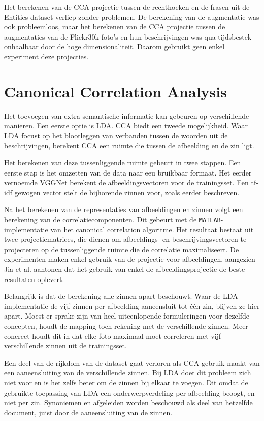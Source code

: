 Het berekenen van de CCA projectie tussen de rechthoeken en de frasen uit de Entities dataset verliep zonder problemen. De berekening van de augmentatie was ook probleemloos, maar het berekenen van de CCA projectie tussen de augmentaties van de Flickr30k foto's en hun beschrijvingen was qua tijdsbestek onhaalbaar door de hoge dimensionaliteit. Daarom gebruikt geen enkel experiment deze projecties. 



\section{Canonical Correlation Analysis}
Het toevoegen van extra semantische informatie kan gebeuren op verschillende manieren. Een eerste optie is LDA. CCA biedt een tweede mogelijkheid. Waar LDA focust op het blootleggen van verbanden tussen de woorden uit de beschrijvingen, berekent CCA een ruimte die tussen de afbeelding en de zin ligt.

Het berekenen van deze tussenliggende ruimte gebeurt in twee stappen. Een eerste stap is het omzetten van de data naar eeu bruikbaar formaat. Het eerder vernoemde VGGNet berekent de afbeeldingsvectoren voor de trainingsset. Een tf-idf gewogen vector stelt de bijhorende zinnen voor, zoals eerder beschreven. 

Na het berekenen van de representaties van afbeeldingen en zinnen volgt een berekening van de correlatiecomponenten. Dit gebeurt met de \texttt{MATLAB}-implementatie van het canonical correlation algoritme. Het resultaat bestaat uit twee projectiematrices, die dienen om afbeeldings- en beschrijvingsvectoren te projecteren op de tussenliggende ruimte die de correlatie maximaliseert. De experimenten maken enkel gebruik van de projectie voor afbeeldingen, aangezien Jia et al.\cite{Fernando2015} aantonen dat het gebruik van enkel de afbeeldingsprojectie de beste resultaten oplevert.

Belangrijk is dat de berekening alle zinnen apart beschouwt. Waar de LDA-implementatie de vijf zinnen per afbeelding aaneensluit tot \'e\'en zin, blijven ze hier apart. Moest er sprake zijn van heel uiteenlopende formuleringen voor dezelfde concepten, houdt de mapping toch rekening met de verschillende zinnen. Meer concreet houdt dit in dat elke foto maximaal moet correleren met vijf verschillende zinnen uit de trainingsset. 

Een deel van de rijkdom van de dataset gaat verloren als CCA gebruik maakt van een aaneensluiting van de verschillende zinnen. Bij LDA doet dit probleem zich niet voor en is het zelfs beter om de zinnen bij elkaar te voegen. Dit omdat de gebruikte toepassing van LDA een onderwerpverdeling per afbeelding beoogt, en niet per zin. Synoniemen en afgeleiden worden beschouwd als deel van hetzelfde document, juist door de aaneensluiting van de zinnen.


